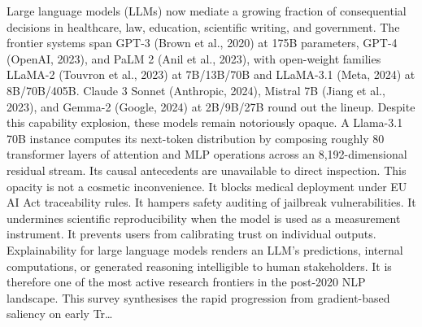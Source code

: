 Large language models (LLMs) now mediate a growing fraction of consequential decisions in healthcare, law, education, scientific writing, and government. The frontier systems span GPT-3 (Brown et al., 2020) at 175B parameters, GPT-4 (OpenAI, 2023), and PaLM 2 (Anil et al., 2023), with open-weight families LLaMA-2 (Touvron et al., 2023) at 7B/13B/70B and LLaMA-3.1 (Meta, 2024) at 8B/70B/405B. Claude 3 Sonnet (Anthropic, 2024), Mistral 7B (Jiang et al., 2023), and Gemma-2 (Google, 2024) at 2B/9B/27B round out the lineup. Despite this capability explosion, these models remain notoriously opaque. A Llama-3.1 70B instance computes its next-token distribution by composing roughly 80 transformer layers of attention and MLP operations across an 8,192-dimensional residual stream. Its causal antecedents are unavailable to direct inspection. This opacity is not a cosmetic inconvenience. It blocks medical deployment under EU AI Act traceability rules. It hampers safety auditing of jailbreak vulnerabilities. It undermines scientific reproducibility when the model is used as a measurement instrument. It prevents users from calibrating trust on individual outputs. Explainability for large language models renders an LLM's predictions, internal computations, or generated reasoning intelligible to human stakeholders. It is therefore one of the most active research frontiers in the post-2020 NLP landscape. This survey synthesises the rapid progression from gradient-based saliency on early Tr\ldots{}
